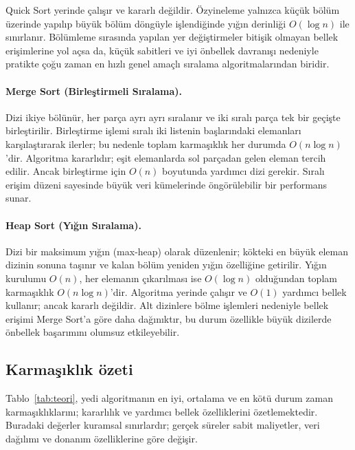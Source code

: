 \documentclass[12pt,a4paper]{article}
\begin{document}
Quick Sort yerinde çalışır ve kararlı değildir. Özyineleme yalnızca küçük
bölüm üzerinde yapılıp büyük bölüm döngüyle işlendiğinde yığın derinliği
$O(\log n)$ ile sınırlanır. Bölümleme sırasında yapılan yer değiştirmeler
bitişik olmayan bellek erişimlerine yol açsa da, küçük sabitleri ve iyi önbellek
davranışı nedeniyle pratikte çoğu zaman en hızlı genel amaçlı sıralama
algoritmalarından biridir.

\paragraph{Merge Sort (Birleştirmeli Sıralama).}
Dizi ikiye bölünür, her parça ayrı ayrı sıralanır ve iki sıralı parça tek bir
geçişte birleştirilir. Birleştirme işlemi sıralı iki listenin başlarındaki
elemanları karşılaştırarak ilerler; bu nedenle toplam karmaşıklık her durumda
$O(n \log n)$'dir. Algoritma kararlıdır; eşit elemanlarda sol parçadan gelen
eleman tercih edilir. Ancak birleştirme için $O(n)$ boyutunda yardımcı dizi
gerekir. Sıralı erişim düzeni sayesinde büyük veri kümelerinde öngörülebilir bir
performans sunar.

\paragraph{Heap Sort (Yığın Sıralama).}
Dizi bir maksimum yığın (max-heap) olarak düzenlenir; kökteki en büyük eleman
dizinin sonuna taşınır ve kalan bölüm yeniden yığın özelliğine getirilir.
Yığın kurulumu $O(n)$, her elemanın çıkarılması ise $O(\log n)$
olduğundan toplam karmaşıklık $O(n \log n)$'dir. Algoritma yerinde çalışır ve
$O(1)$ yardımcı bellek kullanır; ancak kararlı değildir. Alt dizinlere bölme 
işlemleri nedeniyle bellek erişimi Merge Sort'a göre daha dağınıktır, bu durum
özellikle büyük dizilerde önbellek başarımını olumsuz etkileyebilir.

\subsection{Karmaşıklık özeti}

Tablo~\ref{tab:teori}, yedi algoritmanın en iyi, ortalama ve en kötü durum zaman
karmaşıklıklarını; kararlılık ve yardımcı bellek özelliklerini özetlemektedir.
Buradaki değerler kuramsal sınırlardır; gerçek süreler sabit maliyetler, veri
dağılımı ve donanım özelliklerine göre değişir.
\end{document}
